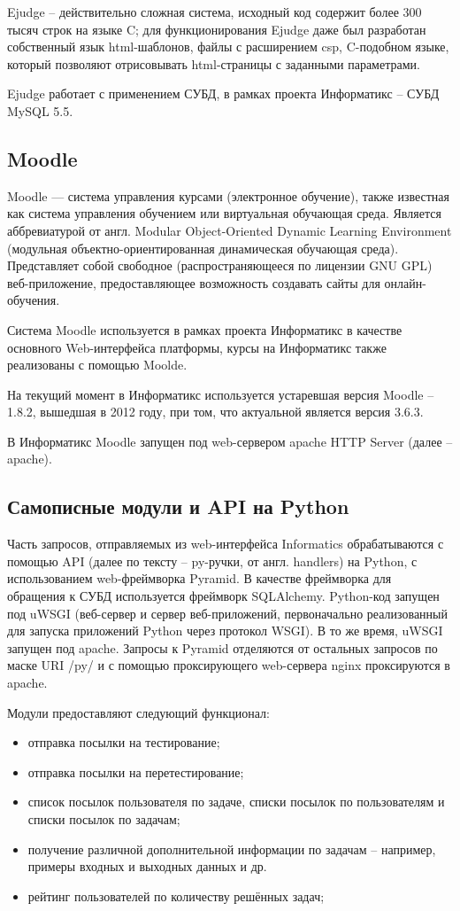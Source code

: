Ejudge -- действительно сложная система, исходный код содержит более 300 тысяч строк на языке C; 
для функционирования Ejudge даже был разработан собственный язык html-шаблонов, файлы с расширением csp, C-подобном языке,
который позволяют отрисовывать html-страницы с заданными параметрами. 

Ejudge работает с применением СУБД, в рамках проекта Информатикс -- СУБД MySQL 5.5.

\subsection{Moodle}
\label{lab:inf_moodle}
Moodle — система управления курсами (электронное обучение), также известная как система управления обучением или виртуальная обучающая среда. Является аббревиатурой от англ. Modular Object-Oriented Dynamic Learning Environment (модульная объектно-ориентированная динамическая обучающая среда). Представляет собой свободное (распространяющееся по лицензии GNU GPL) веб-приложение, предоставляющее возможность создавать сайты для онлайн-обучения.

Система Moodle используется в рамках проекта Информатикс в качестве основного Web-интерфейса платформы, 
курсы на Информатикс также реализованы с помощью Moolde.

На текущий момент в Информатикс используется устаревшая версия Moodle -- 1.8.2, вышедшая в 2012 году, при том, что актуальной является версия 3.6.3.

В Информатикс Moodle запущен под web-сервером apache HTTP Server (далее -- apache).

\subsection{Самописные модули и API на Python}

Часть запросов, отправляемых из web-интерфейса Informatics обрабатываются с помощью API (далее по тексту -- py-ручки, от англ. handlers) на Python, с использованием web-фреймворка Pyramid.
В качестве фреймворка для обращения к СУБД используется фреймворк SQLAlchemy.
Python-код запущен под uWSGI (веб-сервер и сервер веб-приложений, первоначально реализованный для запуска приложений Python через протокол WSGI). В то же время, uWSGI запущен под apache.
Запросы к Pyramid отделяются от остальных запросов по маске URI /py/ и с помощью проксирующего web-сервера nginx проксируются в apache.

Модули предоставляют следующий функционал:
\begin{itemize}
    \item отправка посылки на тестирование;
    \item отправка посылки на перетестирование;
    \item список посылок пользователя по задаче, списки посылок по пользователям и списки посылок по задачам;
    \item получение различной дополнительной информации по задачам -- например, примеры входных и выходных данных и др.
    \item рейтинг пользователей по количеству решённых задач;
\end{itemize}

